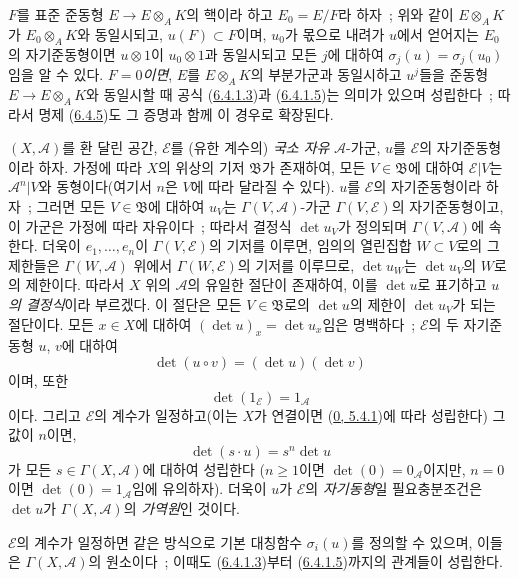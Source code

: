 \begin{remark}[6.4.7]
$F$를 표준 준동형 $E\to E\otimes_AK$의 핵이라 하고 $E_0=E/F$라 하자~;
위와 같이 $E\otimes_AK$가 $E_0\otimes_AK$와 동일시되고,
$u(F)\subset F$이며, $u_0$가 몫으로 내려가 $u$에서 얻어지는 $E_0$의
자기준동형이면 $u\otimes1$이 $u_0\otimes1$과 동일시되고 모든 $j$에
대하여 $\sigma_j(u)=\sigma_j(u_0)$임을 알 수 있다. \emph{$F=0$이면},
$E$를 $E\otimes_AK$의 부분가군과 동일시하고 $u^j$들을
준동형 $E\to E\otimes_AK$와 동일시할 때 공식
(\hyperref[II.6.4.1.3-ko]{6.4.1.3})과
(\hyperref[II.6.4.1.5-ko]{6.4.1.5})는 의미가 있으며 성립한다~; 따라서
명제 (\hyperref[II.6.4.5-ko]{6.4.5})도 그 증명과 함께 이 경우로
확장된다.
\end{remark}

\begin{env}[6.4.8]
\label{II.6.4.8-ko}
$(X,\mathcal{A})$를 환 달린 공간, $\mathcal{E}$를 (유한 계수의)
\emph{국소 자유} $\mathcal{A}$-가군, $u$를 $\mathcal{E}$의
자기준동형이라 하자. 가정에 따라 $X$의 위상의 기저 $\mathfrak{B}$가
존재하여, 모든 $V\in\mathfrak{B}$에 대하여 $\mathcal{E}|V$는
$\mathcal{A}^n|V$와 동형이다(여기서 $n$은 $V$에 따라 달라질 수
있다). $u$를 $\mathcal{E}$의 자기준동형이라 하자~; 그러면 모든
$V\in\mathfrak{B}$에 대하여 $u_V$는
$\Gamma(V,\mathcal{A})$-가군 $\Gamma(V,\mathcal{E})$의
자기준동형이고, 이 가군은 가정에 따라 자유이다~; 따라서 결정식
$\det u_V$가 정의되며 $\Gamma(V,\mathcal{A})$에 속한다. 더욱이
$e_1,\ldots,e_n$이 $\Gamma(V,\mathcal{E})$의 기저를 이루면, 임의의
열린집합 $W\subset V$로의 그 제한들은 $\Gamma(W,\mathcal{A})$ 위에서
$\Gamma(W,\mathcal{E})$의 기저를 이루므로, $\det u_W$는
$\det u_V$의 $W$로의 제한이다. 따라서 $X$ 위의 $\mathcal{A}$의
유일한 절단이 존재하여, 이를 $\det u$로 표기하고
\emph{$u$의 결정식}이라 부르겠다. 이 절단은 모든
$V\in\mathfrak{B}$로의 $\det u$의 제한이 $\det u_V$가 되는 절단이다. 모든
$x\in X$에 대하여 $(\det u)_x=\det u_x$임은 명백하다~; $\mathcal{E}$의
두 자기준동형 $u$, $v$에 대하여
\[
\label{II.6.4.8.1-ko}
\det(u\circ v)=(\det u)(\det v)
\tag{6.4.8.1}
\]
이며, 또한
\[
\label{II.6.4.8.2-ko}
\det(1_{\mathcal{E}})=1_{\mathcal{A}}
\tag{6.4.8.2}
\]
이다. 그리고 $\mathcal{E}$의 계수가 일정하고(이는 $X$가 연결이면
(\hyperref[0.5.4.1-ko]{0, 5.4.1})에 따라 성립한다) 그 값이 $n$이면,
\[
\label{II.6.4.8.3-ko}
\det(s\cdot u)=s^n\det u
\tag{6.4.8.3}
\]
가 모든 $s\in\Gamma(X,\mathcal{A})$에 대하여 성립한다
($n\geq1$이면 $\det(0)=0_{\mathcal{A}}$이지만, $n=0$이면
$\det(0)=1_{\mathcal{A}}$임에 유의하자). 더욱이 $u$가
$\mathcal{E}$의 \emph{자기동형}일 필요충분조건은 $\det u$가
$\Gamma(X,\mathcal{A})$의 \emph{가역원}인 것이다.

$\mathcal{E}$의 계수가 일정하면 같은 방식으로 기본 대칭함수
$\sigma_i(u)$를 정의할 수 있으며, 이들은 $\Gamma(X,\mathcal{A})$의
원소이다~; 이때도 (\hyperref[II.6.4.1.3-ko]{6.4.1.3})부터
(\hyperref[II.6.4.1.5-ko]{6.4.1.5})까지의 관계들이 성립한다.


\end{env}
